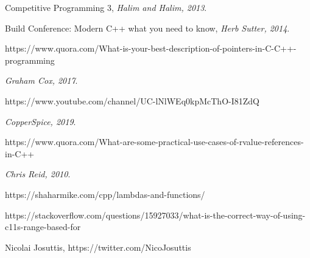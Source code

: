 \documentclass[12pt, fleqn]{report}                             %
\theoremstyle{break}                                            %
\begin{document}
\begin{thebibliography}{10}

        Competitive Programming 3,
        \textit{Halim and Halim, 2013}. 


        Build Conference: Modern C++ what you need to know,
        \textit{Herb Sutter, 2014}. 

        https://www.quora.com/What-is-your-best-description-of-pointers-in-C-C++-programming

        \textit{Graham Cox, 2017}. 

        https://www.youtube.com/channel/UC-lNlWEq0kpMcThO-I81ZdQ

        \textit{CopperSpice, 2019}. 

        https://www.quora.com/What-are-some-practical-use-cases-of-rvalue-references-in-C++

        \textit{Chris Reid, 2010}. 

        https://shaharmike.com/cpp/lambdas-and-functions/

        https://stackoverflow.com/questions/15927033/what-is-the-correct-way-of-using-c11s-range-based-for

        Nicolai Josuttis, https://twitter.com/NicoJosuttis


\end{thebibliography}
\end{document}
